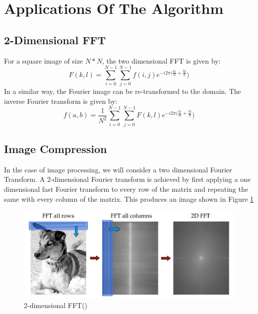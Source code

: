 \documentclass[11pt]{amsart}
\theoremstyle{definition}
\theoremstyle{remark}
\numberwithin{equation}{section}
\begin{document}
\section{Applications Of The Algorithm}
\subsection {2-Dimensional FFT}
For a square image of size $N*N$, the two dimensional FFT is given by:
\[
F(k,l) = \sum_{i=0}^{N-1} \sum_{j =0}^{N-1} f(i,j) e^{-i2\pi(\frac{ki}{N} +\frac{lg}{N}})
\]
In a similar way, the Fourier image can be re-transformed to the domain. The inverse Fourier transform is given by:
\[
	f(a,b) = \frac{1}{N^{2}} \sum_{i=0}^{N-1} \sum_{j =0}^{N-1} F(k,l) e^{-i2\pi(\frac{ki}{N} +\frac{lg}{N}})
\]

\subsection {Image Compression}

In the case of image processing, we will consider a two dimensional Fourier Transform. A 2-dimensional Fourier transform is achieved by first applying a one dimensional fast Fourier transform to every row of the matrix and repeating the same with every column of the matrix. This produces an image shown in Figure \ref{fig:1.1}

\begin{figure}[h!]
    \centering
    \includegraphics[width=0.5\linewidth]{../pictures/Screenshot 2024-05-22 111943.png}
    \caption{2-dimensional FFT(\cite{Brunton_Kutz_2022})}
    \label{fig:1.1}
\end{figure}
\end{document}
